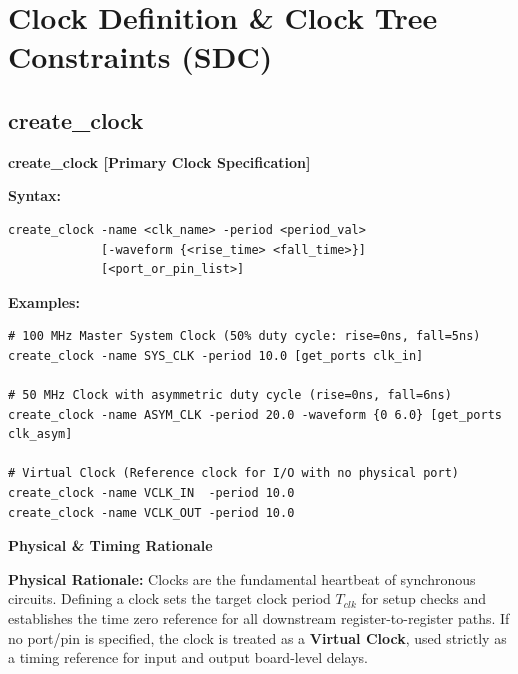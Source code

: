 \documentclass[11pt,a4paper]{article}
\newenvironment{cmdbox}[2]{%
  \begin{mdframed}[style=cmdstyle]%
  {\bfseries\sffamily\color{primary}#1 \hfill \footnotesize\color{mutedgray}[#2]}\par\vspace{3pt}%
}{%
  \end{mdframed}%
}
\newenvironment{physbox}{%
  \begin{mdframed}[style=physstyle]%
  {\bfseries\sffamily\color{darktext}\small Physical \& Timing Rationale}\par\vspace{2pt}\small%
}{%
  \end{mdframed}%
}
\begin{document}
\section{Clock Definition \& Clock Tree Constraints (SDC)}

\subsection{create\_clock}
\begin{cmdbox}{create\_clock}{Primary Clock Specification}
\textbf{Syntax:}
\begin{lstlisting}[style=sdcstyle]
create_clock -name <clk_name> -period <period_val> 
             [-waveform {<rise_time> <fall_time>}] 
             [<port_or_pin_list>]
\end{lstlisting}
\textbf{Examples:}
\begin{lstlisting}[style=sdcstyle]
# 100 MHz Master System Clock (50% duty cycle: rise=0ns, fall=5ns)
create_clock -name SYS_CLK -period 10.0 [get_ports clk_in]

# 50 MHz Clock with asymmetric duty cycle (rise=0ns, fall=6ns)
create_clock -name ASYM_CLK -period 20.0 -waveform {0 6.0} [get_ports clk_asym]

# Virtual Clock (Reference clock for I/O with no physical port)
create_clock -name VCLK_IN  -period 10.0
create_clock -name VCLK_OUT -period 10.0
\end{lstlisting}
\end{cmdbox}

\begin{physbox}
\textbf{Physical Rationale:} Clocks are the fundamental heartbeat of synchronous circuits. Defining a clock sets the target clock period $T_{clk}$ for setup checks and establishes the time zero reference for all downstream register-to-register paths. If no port/pin is specified, the clock is treated as a \textbf{Virtual Clock}, used strictly as a timing reference for input and output board-level delays.
\end{physbox}
\end{document}
